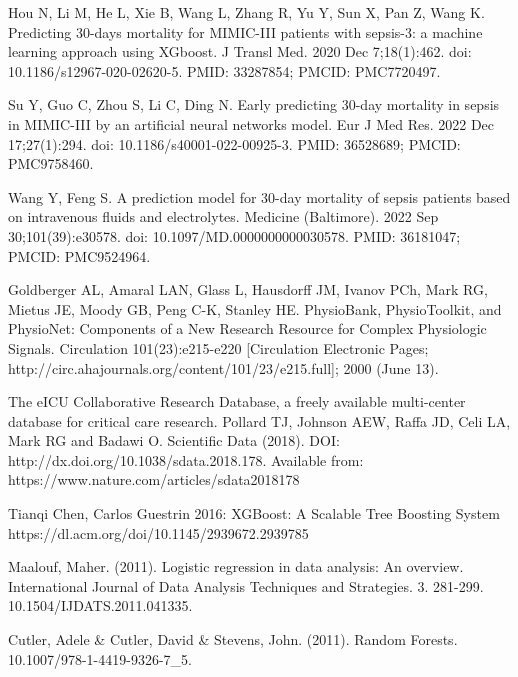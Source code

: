 \documentclass[
	a4paper,
	pagesize,
	pdftex,
	12pt,
	ngerman,
	fleqn,
	final,
	]{scrartcl}
\begin{document}
	\begin{thebibliography}{9}

		Hou N, Li M, He L, Xie B, Wang L, Zhang R, Yu Y, Sun X, Pan Z, Wang K. Predicting 30-days mortality for MIMIC-III patients with sepsis-3: a machine learning approach using XGboost. J Transl Med. 2020 Dec 7;18(1):462. doi: 10.1186/s12967-020-02620-5. PMID: 33287854; PMCID: PMC7720497.

		Su Y, Guo C, Zhou S, Li C, Ding N. Early predicting 30-day mortality in sepsis in MIMIC-III by an artificial neural networks model. Eur J Med Res. 2022 Dec 17;27(1):294. doi: 10.1186/s40001-022-00925-3. PMID: 36528689; PMCID: PMC9758460.

		Wang Y, Feng S. A prediction model for 30-day mortality of sepsis patients based on intravenous fluids and electrolytes. Medicine (Baltimore). 2022 Sep 30;101(39):e30578. doi: 10.1097/MD.0000000000030578. PMID: 36181047; PMCID: PMC9524964.

		Goldberger AL, Amaral LAN, Glass L, Hausdorff JM, Ivanov PCh, Mark RG, Mietus JE, Moody GB, Peng C-K, Stanley HE. PhysioBank, PhysioToolkit, and PhysioNet: Components of a New Research Resource for Complex Physiologic Signals. Circulation 101(23):e215-e220 [Circulation Electronic Pages; http://circ.ahajournals.org/content/101/23/e215.full]; 2000 (June 13).

		The eICU Collaborative Research Database, a freely available multi-center database for critical care research. Pollard TJ, Johnson AEW, Raffa JD, Celi LA, Mark RG and Badawi O. Scientific Data (2018). DOI: http://dx.doi.org/10.1038/sdata.2018.178. Available from: https://www.nature.com/articles/sdata2018178

		Tianqi Chen, Carlos Guestrin 2016: XGBoost: A Scalable Tree Boosting System
		https://dl.acm.org/doi/10.1145/2939672.2939785

		Maalouf, Maher. (2011). Logistic regression in data analysis: An overview. International Journal of Data Analysis Techniques and Strategies. 3. 281-299. 10.1504/IJDATS.2011.041335. 

		Cutler, Adele \& Cutler, David \& Stevens, John. (2011). Random Forests. 10.1007/978-1-4419-9326-7\_5. 

	\end{thebibliography}
\end{document}

